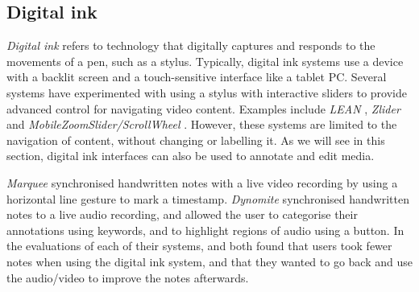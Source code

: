 
\subsection{Digital ink}
\textit{Digital ink} refers to technology that digitally captures and responds to the movements of a pen, such as a
stylus.  Typically, digital ink systems use a device with a backlit screen and a touch-sensitive interface like a
tablet PC.  Several systems have experimented with using a stylus with interactive sliders to provide advanced control
for navigating video content. Examples include \textit{LEAN} \citep{Ramos2003}, \textit{Zlider} \citep{Ramos2005} and
\textit{MobileZoomSlider/ScrollWheel} \citep{Huerst2008}. However, these systems are limited to the navigation of
content, without changing or labelling it.  As we will see in this section, digital ink interfaces can also be used to
annotate and edit media.

\textit{Marquee} \citep{Weher1994} synchronised handwritten notes with a live video recording by using a horizontal
line gesture to mark a timestamp.  \textit{Dynomite} \citep{Wilcox1997} synchronised handwritten notes to a live audio
recording, and allowed the user to categorise their annotations using keywords, and to highlight regions of audio using
a button.  In the evaluations of each of their systems, \citet{Weher1994} and \citet{Wilcox1997} both found that users
took fewer notes when using the digital ink system, and that they wanted to go back and use the audio/video to improve
the notes afterwards.

